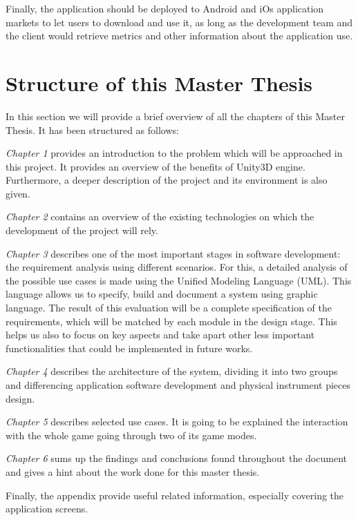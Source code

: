 Finally, the application should be deployed to Android and iOs application markets to let users to download and use it, as long as the development team and the client would retrieve metrics and other information about the application use.


\section{Structure of this Master Thesis}

In this section we will provide a brief overview of all the chapters of this Master Thesis. It
has been structured as follows:

\textit{Chapter 1} provides an introduction to the problem which will be approached in this project. It provides an overview of the benefits of Unity3D engine. Furthermore, a deeper description of the project and its environment is also given.

\textit{Chapter 2} contains an overview of the existing technologies on which the development of the project will rely.

\textit{Chapter 3} describes one of the most important stages in software development: the requirement analysis using different scenarios. For this, a detailed analysis of the possible use cases is made using the Unified Modeling Language (UML). This language allows us to specify, build and document a system using graphic language.
The result of this evaluation will be a complete specification of the requirements, which will be matched by each module in the design stage. This helps us also to focus on key aspects and take apart other less important functionalities that could be implemented in future works.

\textit{Chapter 4} describes the architecture of the system, dividing it into two groups and differencing application software development and physical instrument pieces design.

\textit{Chapter 5} describes selected use cases. It is going to be explained the interaction with the whole game going through two of its game modes.

\textit{Chapter 6} sums up the findings and conclusions found throughout the document and gives a hint about the work done for this master thesis.

Finally, the appendix provide useful related information, especially covering the application screens.
